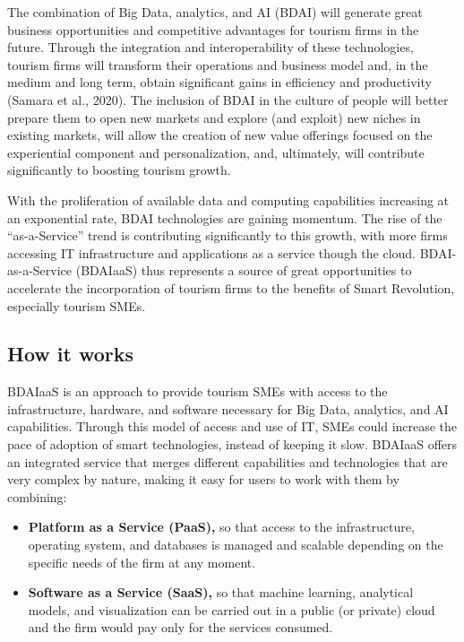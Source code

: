 \documentclass[
  letterpaper,
  DIV=11,
  numbers=noendperiod]{scrreprt}
\begin{document}
The combination of Big Data, analytics, and AI (BDAI) will generate
great business opportunities and competitive advantages for tourism
firms in the future. Through the integration and interoperability of
these technologies, tourism firms will transform their operations and
business model and, in the medium and long term, obtain significant
gains in efficiency and productivity (Samara et al., 2020). The
inclusion of BDAI in the culture of people will better prepare them to
open new markets and explore (and exploit) new niches in existing
markets, will allow the creation of new value offerings focused on the
experiential component and personalization, and, ultimately, will
contribute significantly to boosting tourism growth.

With the proliferation of available data and computing capabilities
increasing at an exponential rate, BDAI technologies are gaining
momentum. The rise of the ``as-a-Service'' trend is contributing
significantly to this growth, with more firms accessing IT
infrastructure and applications as a service though the cloud.
BDAI-as-a-Service (BDAIaaS) thus represents a source of great
opportunities to accelerate the incorporation of tourism firms to the
benefits of Smart Revolution, especially tourism SMEs.

\hypertarget{how-it-works-1}{%
\subsection{How it works}\label{how-it-works-1}}

BDAIaaS is an approach to provide tourism SMEs with access to the
infrastructure, hardware, and software necessary for Big Data,
analytics, and AI capabilities. Through this model of access and use of
IT, SMEs could increase the pace of adoption of smart technologies,
instead of keeping it slow. BDAIaaS offers an integrated service that
merges different capabilities and technologies that are very complex by
nature, making it easy for users to work with them by combining:

\begin{itemize}
\item
  \textbf{Platform as a Service (PaaS),} so that access to the
  infrastructure, operating system, and databases is managed and
  scalable depending on the specific needs of the firm at any moment.
\item
  \textbf{Software as a Service (SaaS),} so that machine learning,
  analytical models, and visualization can be carried out in a public
  (or private) cloud and the firm would pay only for the services
  consumed.
\end{itemize}
\end{document}
